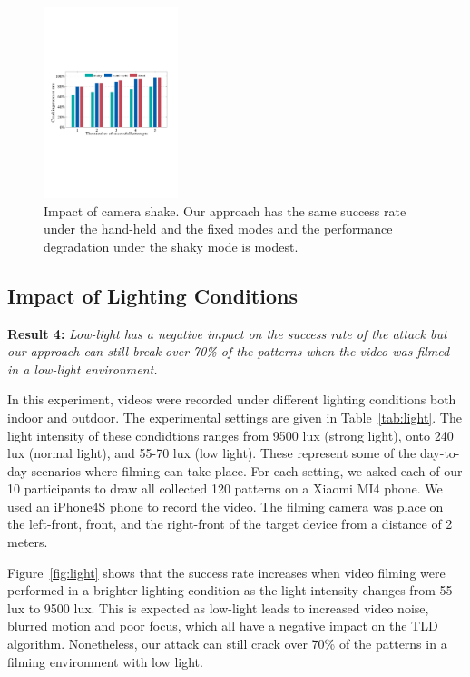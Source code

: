 \begin{figure}[!t]
    \centering
    \includegraphics[width=0.35\textwidth]{fig/14.pdf}
    \vspace{-2mm}
    \caption{Impact of camera shake. Our approach has the same success rate under the hand-held and the fixed modes and the performance degradation under the shaky mode is modest. }
   \vspace{-2mm}
    \label{fig:fig14}
\end{figure}





    \subsection{Impact of Lighting Conditions \label{sec:light}}
    \noindent \textbf{Result 4:} \emph{Low-light has a negative impact on the success rate of the attack but our approach can still break over 70\% of the patterns when the video was filmed in a low-light environment.}

    In this experiment, videos were recorded under different lighting conditions both indoor and outdoor.
    The experimental settings are given in  Table~\ref{tab:light}.
    The light intensity of these condidtions ranges from 9500
    lux (strong light), onto 240 lux (normal light), and 55-70 lux (low light).
    These represent some of the day-to-day scenarios where filming can
    take place. For each setting, we asked each of our 10 participants to draw all collected 120 patterns on a Xiaomi MI4 phone. We used
    an iPhone4S phone to record the video. The filming camera was place on the
    left-front, front, and the right-front of the target device from a distance
    of 2 meters.


    Figure~\ref{fig:light} shows that the success rate increases when video filming were performed in a brighter lighting condition as the light intensity
    changes from 55 lux to 9500 lux. This is expected as low-light leads to
    increased video noise, blurred motion and poor focus, which all have a
    negative impact on the TLD algorithm. Nonetheless, our attack
    can still crack over 70\% of the patterns in a filming
    environment with low light.


